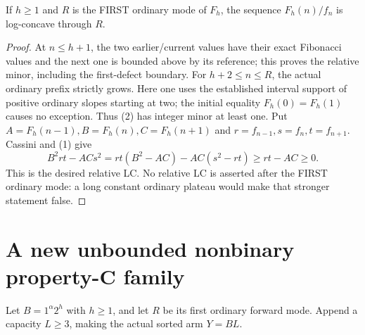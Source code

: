 \begin{corollary}
If $h\ge1$ and $R$ is the FIRST ordinary mode of $F_h$, the
sequence $F_h(n)/f_n$ is log-concave through $R$.
\end{corollary}
\begin{proof}
At $n\le h+1$, the two earlier/current values have their exact
Fibonacci values and the next one is bounded above by its reference;
this proves the relative minor, including the first-defect boundary.
For $h+2\le n\le R$, the actual ordinary prefix strictly grows.
Here one uses the established interval support of positive ordinary
slopes starting at two; the initial equality $F_h(0)=F_h(1)$
causes no exception.  Thus (2) has integer minor at least one.
Put $A=F_h(n-1),B=F_h(n),C=F_h(n+1)$ and
$r=f_{n-1},s=f_n,t=f_{n+1}$.  Cassini and (1) give
\[
 B^2rt-ACs^2
   =rt(B^2-AC)-AC(s^2-rt)\ge rt-AC\ge0.               \tag{5}
\]
This is the desired relative LC.  No relative LC is asserted
after the FIRST ordinary mode: a long constant ordinary plateau
would make that stronger statement false.
\end{proof}

\section{A new unbounded nonbinary property-C family}
Let $B=1^\alpha2^h$ with $h\ge1$, and let $R$ be its first
ordinary forward mode.  Append a capacity $L\ge3$, making the
actual sorted arm $Y=BL$.

